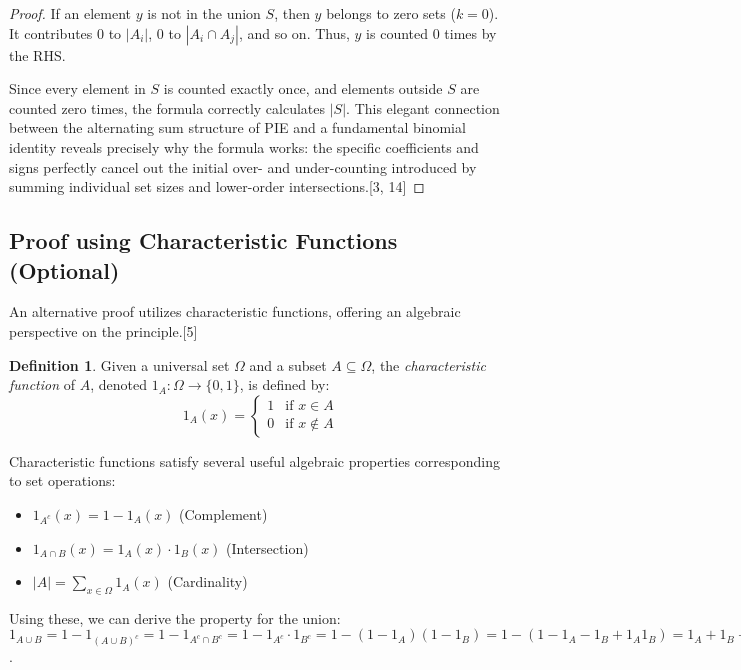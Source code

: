\documentclass[11pt]{amsart}
\theoremstyle{plain}
\theoremstyle{definition}
\newtheorem{definition}[theorem]{Definition}
\theoremstyle{remark}
\begin{document}
\begin{proof}
If an element $y$ is not in the union $S$, then $y$ belongs to zero sets ($k=0$). It contributes 0 to $|A_i|$, 0 to $|A_i \cap A_j|$, and so on. Thus, $y$ is counted 0 times by the RHS.

Since every element in $S$ is counted exactly once, and elements outside $S$ are counted zero times, the formula correctly calculates $|S|$. This elegant connection between the alternating sum structure of PIE and a fundamental binomial identity reveals precisely why the formula works: the specific coefficients and signs perfectly cancel out the initial over- and under-counting introduced by summing individual set sizes and lower-order intersections.[3, 14]
\end{proof}

\subsection{Proof using Characteristic Functions (Optional)}
An alternative proof utilizes characteristic functions, offering an algebraic perspective on the principle.[5]

\begin{definition}
Given a universal set $\Omega$ and a subset $A \subseteq \Omega$, the \emph{characteristic function} of $A$, denoted $1_A: \Omega \to \{0, 1\}$, is defined by:
\[ 1_A(x) = \begin{cases} 1 & \text{if } x \in A \\ 0 & \text{if } x \notin A \end{cases} \]
\end{definition}

Characteristic functions satisfy several useful algebraic properties corresponding to set operations:
\begin{itemize}
    \item $1_{A^c}(x) = 1 - 1_A(x)$ (Complement)
    \item $1_{A \cap B}(x) = 1_A(x) \cdot 1_B(x)$ (Intersection)
    \item $|A| = \sum_{x \in \Omega} 1_A(x)$ (Cardinality)
\end{itemize}
Using these, we can derive the property for the union:
$1_{A \cup B} = 1 - 1_{(A \cup B)^c} = 1 - 1_{A^c \cap B^c} = 1 - 1_{A^c} \cdot 1_{B^c} = 1 - (1 - 1_A)(1 - 1_B) = 1 - (1 - 1_A - 1_B + 1_A 1_B) = 1_A + 1_B - 1_A 1_B = 1_A + 1_B - 1_{A \cap B}$.
\end{document}
